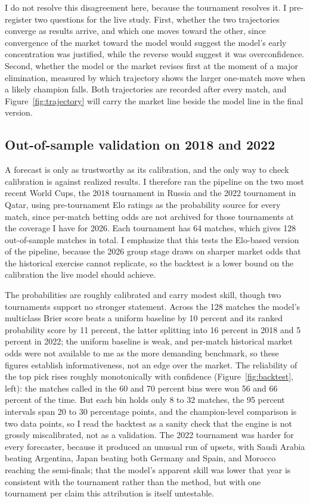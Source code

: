 \documentclass[11pt,letterpaper]{article}
\begin{document}
I do not resolve this disagreement here, because the tournament resolves it. I pre-register two questions for the live study. First, whether the two trajectories converge as results arrive, and which one moves toward the other, since convergence of the market toward the model would suggest the model's early concentration was justified, while the reverse would suggest it was overconfidence. Second, whether the model or the market revises first at the moment of a major elimination, measured by which trajectory shows the larger one-match move when a likely champion falls. Both trajectories are recorded after every match, and Figure~\ref{fig:trajectory} will carry the market line beside the model line in the final version.



\subsection{Out-of-sample validation on 2018 and 2022}\label{sec:backtest}

A forecast is only as trustworthy as its calibration, and the only way to check calibration is against realized results. I therefore ran the pipeline on the two most recent World Cups, the 2018 tournament in Russia and the 2022 tournament in Qatar, using pre-tournament Elo ratings as the probability source for every match, since per-match betting odds are not archived for those tournaments at the coverage I have for 2026. Each tournament has 64 matches, which gives 128 out-of-sample matches in total. I emphasize that this tests the Elo-based version of the pipeline, because the 2026 group stage draws on sharper market odds that the historical exercise cannot replicate, so the backtest is a lower bound on the calibration the live model should achieve.

The probabilities are roughly calibrated and carry modest skill, though two tournaments support no stronger statement. Across the 128 matches the model's multiclass Brier score beats a uniform baseline by 10 percent and its ranked probability score \citep{constantinou2012} by 11 percent, the latter splitting into 16 percent in 2018 and 5 percent in 2022; the uniform baseline is weak, and per-match historical market odds were not available to me as the more demanding benchmark, so these figures establish informativeness, not an edge over the market. The reliability of the top pick rises roughly monotonically with confidence (Figure~\ref{fig:backtest}, left): the matches called in the 60 and 70 percent bins were won 56 and 66 percent of the time. But each bin holds only 8 to 32 matches, the 95 percent intervals span 20 to 30 percentage points, and the champion-level comparison is two data points, so I read the backtest as a sanity check that the engine is not grossly miscalibrated, not as a validation. The 2022 tournament was harder for every forecaster, because it produced an unusual run of upsets, with Saudi Arabia beating Argentina, Japan beating both Germany and Spain, and Morocco reaching the semi-finals; that the model's apparent skill was lower that year is consistent with the tournament rather than the method, but with one tournament per claim this attribution is itself untestable.
\end{document}
